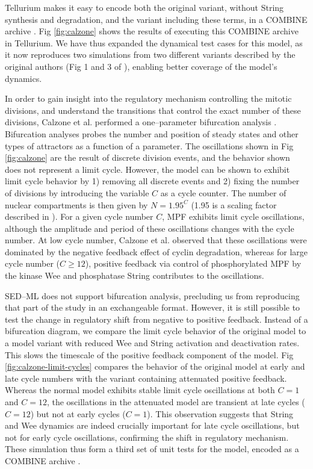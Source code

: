 \documentclass[10pt,letterpaper]{article}
\begin{document}
Tellurium makes it easy to encode both the original variant, without String synthesis and degradation, and the variant including these terms, in a COMBINE archive \cite{calzone-fig1-fig3}. Fig \ref{fig:calzone} shows the results of executing this COMBINE archive in Tellurium. We have thus expanded the dynamical test cases for this model, as it now reproduces two simulations from two different variants described by the original authors (Fig 1 and 3 of \cite{calzone2007dynamical}), enabling better coverage of the model's dynamics.

In order to gain insight into the regulatory mechanism controlling the mitotic divisions, and understand the transitions that control the exact number of these divisions, Calzone et al. performed a one--parameter bifurcation analysis \cite{calzone2007dynamical}. Bifurcation analyses probes the number and position of steady states and other types of attractors as a function of a parameter. The oscillations shown in Fig \ref{fig:calzone} are the result of discrete division events, and the behavior shown does not represent a limit cycle. However, the model can be shown to exhibit limit cycle behavior by 1) removing all discrete events and 2) fixing the number of divisions by introducing the variable $C$ as a cycle counter. The number of nuclear compartments is then given by $N = 1.95^C$ (1.95 is a scaling factor described in \cite{calzone2007dynamical}). For a given cycle number $C$, MPF exhibits limit cycle oscillations, although the amplitude and period of these oscillations changes with the cycle number. At low cycle number, Calzone et al. observed that these oscillations were dominated by the negative feedback effect of cyclin degradation, whereas for large cycle number ($C \ge 12$), positive feedback via control of phosphorylated MPF by the kinase Wee and phosphatase String contributes to the oscillations.

SED--ML does not support bifurcation analysis, precluding us from reproducing that part of the study in an exchangeable format. However, it is still possible to test the change in regulatory shift from negative to positive feedback. Instead of a bifurcation diagram, we compare the limit cycle behavior of the original model to a model variant with reduced Wee and String activation and deactivation rates. This slows the timescale of the positive feedback component of the model. Fig \ref{fig:calzone-limit-cycles} compares the behavior of the original model at early and late cycle numbers with the variant containing attenuated positive feedback. Whereas the normal model exhibits stable limit cycle oscillations at both $C=1$ and $C=12$, the oscillations in the attenuated model are transient at late cycles ($C=12$) but not at early cycles ($C=1$). This observation suggests that String and Wee dynamics are indeed crucially important for late cycle oscillations, but not for early cycle oscillations, confirming the shift in regulatory mechanism. These simulation thus form a third set of unit tests for the model, encoded as a COMBINE archive \cite{calzone-feedback-archive}.
\end{document}
